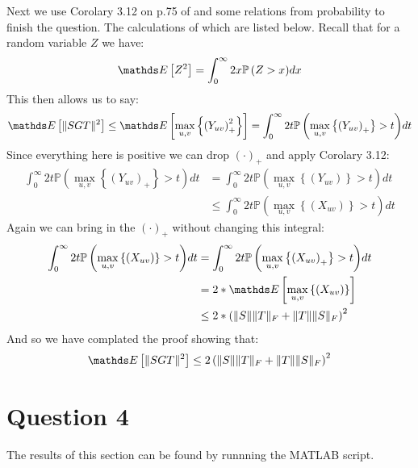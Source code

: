Next we use Corolary 3.12 on p.75 of \cite{Ledoux2011Probability} and some relations from probability to finish the question. The calculations of which
are listed below. Recall that for a random variable $Z$ we have:
\begin{equation*}
    \pexp{Z^2} = \int_{0}^{\infty}{2x\mathbb{P}\left(Z > x \right)} dx
\end{equation*}
This then allows us to say:
\begin{align*}
    \pexp{\norm{SGT}^2} \leq \pexp{\underset{u,v}{\max}\left\{ \left(Y_{uv}\right)_{+}^2 \right \}} = \int_{0}^{\infty}{2t\mathbb{P}\left(\underset{u,v}{\max}\left\{ \left(Y_{uv}\right)_{+} \right\} > t \right)} dt 
\end{align*}
Since everything here is positive we can drop $(\cdot)_{+}$ and apply Corolary 3.12:
\begin{align*}
    \int_{0}^{\infty}{2t\mathbb{P}\left(\underset{u,v}{\max}\left\{ \left(Y_{uv}\right)_{+} \right\} > t \right)} dt  &= \int_{0}^{\infty}{2t\mathbb{P}\left(\underset{u,v}{\max}\left\{ \left(Y_{uv}\right) \right\} > t \right)} dt \\
                                                                                                                    &\leq \int_{0}^{\infty}{2t\mathbb{P}\left(\underset{u,v}{\max}\left\{ \left(X_{uv}\right) \right\} > t \right)} dt 
\end{align*}
Again we can bring in the $(\cdot)_{+}$ without changing this integral:
\begin{align*}
    \int_{0}^{\infty}{2t\mathbb{P}\left(\underset{u,v}{\max}\left\{ \left(X_{uv}\right) \right\} > t \right)} dt &= \int_{0}^{\infty}{2t\mathbb{P}\left(\underset{u,v}{\max}\left\{ \left(X_{uv}\right)_{+} \right\} > t \right)} dt \\
                                                                                                               &= 2*\pexp{\underset{u,v}{\max}\left\{(X_{uv})\right\}} \\
                                                                                                               &\leq  2*\left( \norm{S}\norm{T}_F +\norm{T}\norm{S}_F\right)^2
\end{align*}
And so we have complated the proof showing that:
\begin{equation*}
    \pexp{\norm{SGT}^2} \leq 2\left( \norm{S}\norm{T}_F +\norm{T}\norm{S}_F\right)^2
\end{equation*}

\section{Question 4}
The results of this section can be found by runnning the MATLAB script.